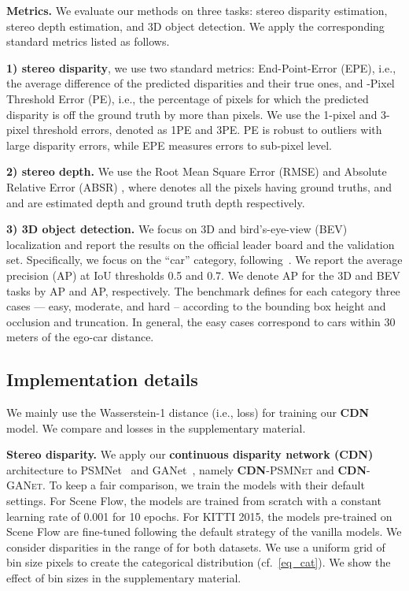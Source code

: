 \documentclass{article}
\newcommand{\method}[1]{\textsc{#1}}
\newcommand{\APBEV}{AP\xspace}
\newcommand{\AP}{AP\xspace}
\newcommand{\PSMNet}{\method{PSMNet}\xspace}
\newcommand{\GANet}{\method{GANet}\xspace}
\newcommand{\CDN}{\textbf{\method{CDN}}\xspace}
\renewcommand{\paragraph}[1]{\vspace{-0.5ex}\textbf{#1}}
\newcommand{\ie}{i.e.\xspace}
\begin{document}
\paragraph{Metrics.} We evaluate our methods on three tasks: stereo disparity estimation, stereo depth estimation, and 3D object detection. We apply the corresponding standard metrics listed as follows.

\textbf{1) stereo disparity}, we use two standard metrics: End-Point-Error (EPE), \ie, the average difference of the predicted disparities and their true
ones, and -Pixel Threshold Error (PE), \ie, the percentage of pixels for which the predicted disparity is off the ground truth by more than  pixels. We use the 1-pixel and 3-pixel threshold errors, denoted as 1PE and 3PE. PE is robust to outliers with large disparity errors, while EPE measures errors to sub-pixel level. 

\textbf{2) stereo depth.} We use the Root Mean Square Error (RMSE)  and Absolute Relative Error (ABSR) , where  denotes all the pixels having ground truths, and  and  are estimated depth and ground truth depth respectively.

\textbf{3) 3D object detection.} We focus on 3D and bird’s-eye-view (BEV) localization and report the results on the official leader board and the validation set. Specifically, we focus on the “car” category, following~\cite{chen2017multi, xu2018pointfusion}. We report the average precision (AP) at IoU thresholds 0.5 and 0.7. We denote AP for the 3D and BEV tasks by \AP and \APBEV, respectively. The benchmark defines for each category three cases --- easy, moderate, and
hard -- according to the bounding box height and occlusion and truncation. In general, the easy cases correspond to cars within 30 meters of the ego-car distance. 

\subsection{Implementation details}
\label{ssec:ID}
We mainly use the Wasserstein-1 distance (\ie,  loss) for training our \CDN model. We compare  and  losses in the supplementary material.

\paragraph{Stereo disparity.}
We apply our \textbf{continuous disparity network (\CDN)} architecture to PSMNet~\cite{chang2018pyramid} and GANet~\cite{zhang2019ga}, namely \CDN-\PSMNet and \CDN-\GANet.
To keep a fair comparison, we train the models with their default settings.
For Scene Flow, the models are trained from
scratch with a constant learning rate of 0.001 for 10 epochs. For KITTI 2015, the models pre-trained on Scene Flow are fine-tuned following the default strategy of the vanilla models.
We consider disparities in the range of  for both datasets.  We use a uniform grid of bin size  pixels to create the categorical distribution (cf.~\autoref{eq_cat}).
We show the effect of bin sizes in the supplementary material.
\end{document}
